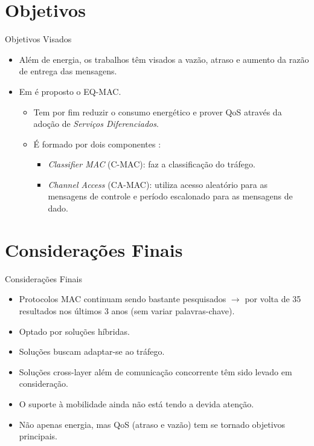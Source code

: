 \documentclass{beamer}
\begin{document}
\section{Objetivos}
\begin{frame}{Objetivos Visados}
  \hypertarget{eq-mac_back}{}
  \begin{itemize}
    \item Além de energia, os trabalhos têm visados a vazão, atraso e aumento da razão de entrega das mensagens.
    \item Em \cite{20092612148942} é proposto o EQ-MAC.
    \begin{itemize}
      \item Tem por fim reduzir o consumo energético e prover QoS através da adoção de \emph{Serviços Diferenciados}.
      \item É formado por dois componentes \hyperlink{eq-mac}{}:
      \begin{itemize}
	\item \emph{Classifier MAC} (C-MAC): faz a classificação do tráfego.
	\item \emph{Channel Access} (CA-MAC): utiliza acesso aleatório para as mensagens de controle e período escalonado para as mensagens de dado.%
	\hypertarget{quadro_eq-mac_back}{}
      \end{itemize}
    \end{itemize}
  \end{itemize}
\end{frame}

\section{Considerações Finais}
\begin{frame}{Considerações Finais}
  \begin{itemize}
    \item Protocolos MAC continuam sendo bastante pesquisados $\rightarrow$ por volta de 35 resultados nos últimos 3 anos (sem variar palavras-chave).
    \item Optado por soluções híbridas.
    \item Soluções buscam adaptar-se ao tráfego.
    \item Soluções cross-layer além de comunicação concorrente têm sido levado em consideração.
    \item O suporte à mobilidade ainda não está tendo a devida atenção.
    \item Não apenas energia, mas QoS (atraso e vazão) tem se tornado objetivos principais.
  \end{itemize}
\end{frame}
\end{document}

